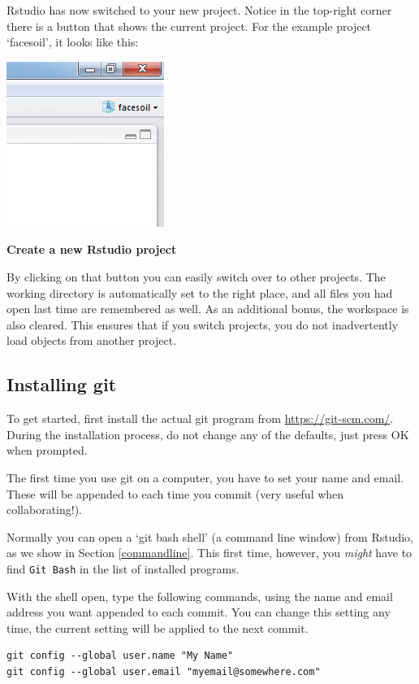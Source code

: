 \documentclass[]{book}
\begin{document}
Rstudio has now switched to your new project. Notice in the top-right corner there is a button that shows the current project. For the example project `facesoil', it looks like this:

\includegraphics[width=0.3\linewidth]{screenshots/projectbutton}

\textbf{Create a new Rstudio project}

By clicking on that button you can easily switch over to other projects. The working directory is automatically set to the right place, and all files you had open last time are remembered as well. As an additional bonus, the workspace is also cleared. This ensures that if you switch projects, you do not inadvertently load objects from another project.

\hypertarget{installing-git}{%
\subsection{Installing git}\label{installing-git}}

To get started, first install the actual git program from \url{https://git-scm.com/}. During the installation process, do not change any of the defaults, just press OK when prompted.

The first time you use git on a computer, you have to set your name and email. These will be appended to each time you commit (very useful when collaborating!).

Normally you can open a `git bash shell' (a command line window) from Rstudio, as we show in Section \ref{commandline}. This first time, however, you \emph{might} have to find \texttt{Git\ Bash} in the list of installed programs.

With the shell open, type the following commands, using the name and email address you want appended to each commit. You can change this setting any time, the current setting will be applied to the next commit.

\begin{verbatim}
git config --global user.name "My Name"
git config --global user.email "myemail@somewhere.com"
\end{verbatim}
\end{document}
